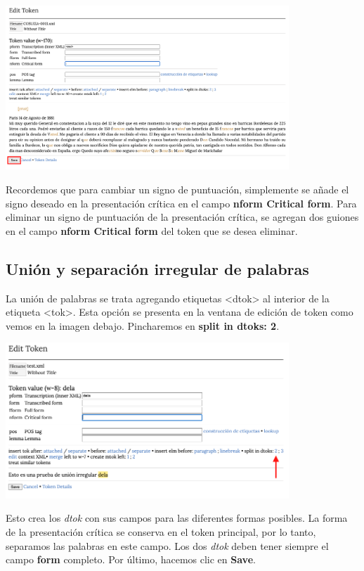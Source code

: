 \documentclass[
]{book}
\begin{document}
\includegraphics[width=0.8\textwidth,height=\textheight]{img/add1.png}

Recordemos que para cambiar un signo de puntuación, simplemente se añade el signo deseado en la presentación crítica en el campo \textbf{nform Critical form}. Para eliminar un signo de puntuación de la presentación crítica, se agregan dos guiones en el campo \textbf{nform Critical form} del token que se desea eliminar.

\hypertarget{uniuxf3n-y-separaciuxf3n-irregular-de-palabras}{%
\subsection*{Unión y separación irregular de palabras}\label{uniuxf3n-y-separaciuxf3n-irregular-de-palabras}}

La unión de palabras se trata agregando etiquetas { \textless dtok\textgreater{}} al interior de la etiqueta { \textless tok\textgreater{}}. Esta opción se presenta en la ventana de edición de token como vemos en la imagen debajo. Pincharemos en \textbf{split in dtoks: 2}.

\includegraphics[width=0.8\textwidth,height=\textheight]{img/dela.png}

Esto crea los \emph{dtok} con sus campos para las diferentes formas posibles. La forma de la presentación crítica se conserva en el token principal, por lo tanto, separamos las palabras en este campo. Los dos \emph{dtok} deben tener siempre el campo \textbf{form} completo. Por último, hacemos clic en \textbf{Save}.
\end{document}
